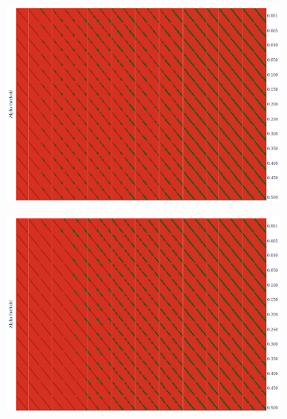 \documentclass{article}
\begin{document}
\begin{figure}
    \centering
    \begin{subfigure}[t]{0.7\linewidth}
        \includegraphics[width=\linewidth]{figures/inter-subject/one_mct_fwe_bonferroni_RR.pdf}
    \end{subfigure}
    \begin{subfigure}[t]{0.7\linewidth}
        \includegraphics[width=\linewidth]{figures/inter-subject/one_mct_fwe_bonferroni_RS.pdf}
    \end{subfigure}
    \begin{subfigure}[t]{0.7\linewidth}

\end{subfigure}
\end{figure}
\end{document}
